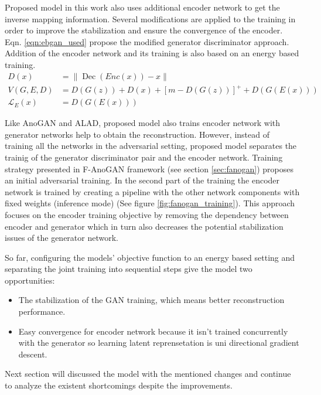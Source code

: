 Proposed model in this work also uses additional encoder network to get the inverse mapping
information. Several modifications are applied to the training in order to improve the stabilization
and ensure the convergence of the encoder. Eqn. \ref{eqn:ebgan_used} propose the modified generator
discriminator approach. Addition of the encoder network and its training is also based on an energy
based training.
\begin{equation}
\label{eqn:encebgan_used}
\begin{aligned}
D(x)&=\|\operatorname{Dec}(E n c(x))-x\|\\[5pt]
V(G,E, D) &= D(G(z)) + D(x)+[m-D(G(z))]^{+} + D(G(E(x))) \\[5pt]
\mathcal{L}_{E}(x) &= D(G(E(x)))
\end{aligned}
\end{equation}

Like AnoGAN and ALAD, proposed model also trains encoder network with generator networks help to
obtain the reconstruction. However, instead of training all the networks in the adversarial setting,
proposed model separates the trainig of the generator discriminator pair and the encoder network.
Training strategy presented in F-AnoGAN framework (see section \ref{sec:fanogan}) proposes an
initial adversarial training. In the second part of the training the encoder network is trained by
creating a pipeline with the other network components with fixed weights (inference mode) (See
figure \ref{fig:fanogan_training}). This approach focuses on the encoder training objective by
removing the dependency between encoder and generator which in turn also decreases the potential
stabilization issues of the generator network.

So far, configuring the models' objective function to an energy based setting and separating the
joint training into sequential steps give the model two opportunities:

\begin{itemize}
	\item The stabilization of the GAN training, which means better reconstruction performance.
	\item Easy convergence for encoder network because it isn't trained concurrently with the
	generator so learning latent reprensetation is uni directional gradient descent.
\end{itemize}

Next section will discussed the model with the mentioned changes and continue to analyze the
existent shortcomings despite the improvements.


